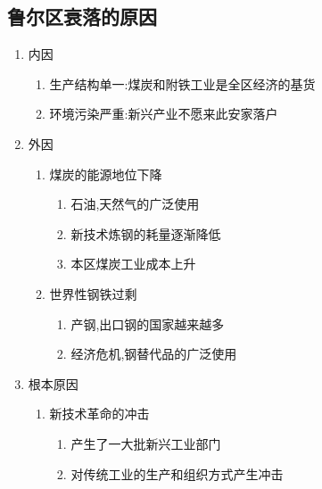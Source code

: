 \documentclass[a4paper]{article}
\begin{document}
    \subsection{鲁尔区衰落的原因}
    \begin{enumerate}
        \item 内因
        \begin{enumerate}
            \item 生产结构单一:煤炭和附铁工业是全区经济的基货
            \item 环境污染严重:新兴产业不愿来此安家落户
        \end{enumerate}
        \item 外因
        \begin{enumerate}
            \item 煤炭的能源地位下降
            \begin{enumerate}
                \item 石油,天然气的广泛使用
                \item 新技术炼钢的耗量逐渐降低
                \item 本区煤炭工业成本上升
            \end{enumerate}
            \item 世界性钢铁过剩
            \begin{enumerate}
                \item 产钢,出口钢的国家越来越多
                \item 经济危机,钢替代品的广泛使用
            \end{enumerate}
        \end{enumerate}
        \item 根本原因
        \begin{enumerate}
            \item 新技术革命的冲击
            \begin{enumerate}
                \item 产生了一大批新兴工业部门
                \item 对传统工业的生产和组织方式产生冲击
            \end{enumerate}
        \end{enumerate}
    \end{enumerate}
\end{document}
